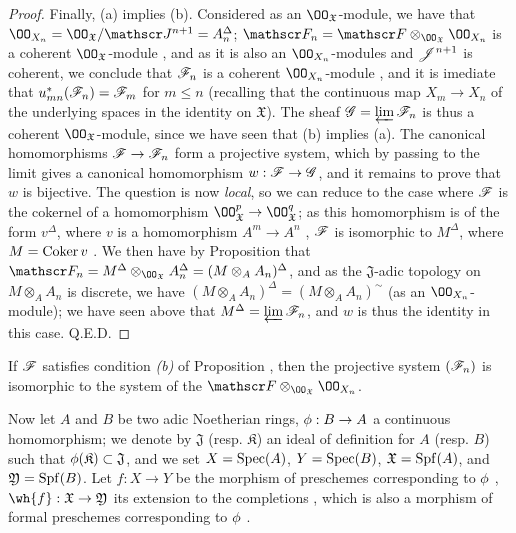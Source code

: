 \begin{proof}
Finally, (a) implies (b).
Considered as an $\OO_\mathfrak{X}$-module, we have that $\OO_{X_n}=\OO_\mathfrak{X}/\sh{J}^{n+1}=A_n^\Delta$; $\sh{F}_n=\sh{F}\otimes_{\OO_\mathfrak{X}}\OO_{X_n}$ is a coherent $\OO_\mathfrak{X}$-module , and as it is also an $\OO_{X_n}$-modules and $\mathscr{J}^{n+1}$ is coherent, we conclude that $\mathscr{F}_n$ is a coherent $\OO_{X_n}$-module , and it is imediate that $u_{mn}^*(\mathscr{F}_n)=\mathscr{F}_m$ for $m\leq n$ (recalling that the continuous map $X_m\to X_n$ of the underlying spaces in the identity on $\mathfrak{X}$).
The sheaf $\mathscr{G}=\varprojlim\mathscr{F}_n$ is thus a coherent $\OO_\mathfrak{X}$-module, since we have seen that (b) implies (a). The canonical homomorphisms $\sh{F}\to\sh{F}_n$ form a projective system, which by passing to the limit gives a canonical homomorphism $w:\sh{F}\to\sh{G}$, and it remains to prove that $w$ is bijective.
The question is now \emph{local}, so we can reduce to the case where $\mathscr{F}$ is the cokernel of a homomorphism $\OO_\mathfrak{X}^p\to\OO_\mathfrak{X}^q$; as this homomorphism is of the form $v^\Delta$, where $v$ is a homomorphism $A^m\to A^n$ , $\mathscr{F}$ is isomorphic to $M^\Delta$, where $M=\operatorname{Coker}{v}$ .
We then have by Proposition  that $\sh{F}_n=M^\Delta\otimes_{\OO_\mathfrak{X}}A_n^\Delta=(M\otimes_A A_n)^\Delta$, and as the $\mathfrak{J}$-adic topology on $M\otimes_A A_n$ is discrete, we have $(M\otimes_A A_n)^\Delta=(M\otimes_A A_n)^\sim$ (as an $\OO_{X_n}$-module); we have seen above that $M^\Delta=\varprojlim\mathscr{F}_n$, and $w$ is thus the identity in this case.
Q.E.D.
\end{proof}

\begin{cor}[10.10.6]
\label{1.10.10.6}
If $\mathscr{F}$ satisfies condition \emph{(b)} of Proposition , then the projective system $(\mathscr{F}_n)$ is isomorphic to the system of the $\sh{F}\otimes_{\OO_\mathfrak{X}}\OO_{X_n}$.
\end{cor}

\begin{env}[10.10.7]
\label{1.10.10.7}
Now let $A$ and $B$ be two adic Noetherian rings, $\vphi:B\to A$ a continuous homomorphism; we denote by $\mathfrak{J}$ (resp. $\mathfrak{K}$) an ideal of definition for $A$ (resp. $B$) such that $\phi(\mathfrak{K})\subset\mathfrak{J}$, and we set $X=\operatorname{Spec}(A)$, $Y=\operatorname{Spec}(B)$, $\mathfrak{X}=\operatorname{Spf}(A)$, and $\mathfrak{Y}=\operatorname{Spf}(B)$.
Let $f:X\to Y$ be the morphism of preschemes corresponding to $\phi$ , $\wh{f}:\mathfrak{X}\to\mathfrak{Y}$ its extension to the completions , which is also a morphism of formal preschemes corresponding to $\phi$ .
\end{env}

